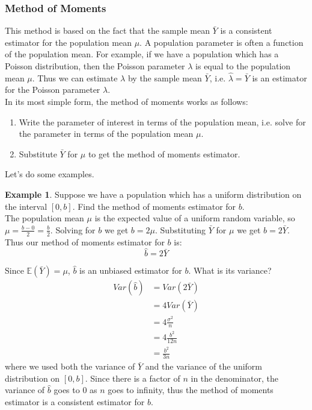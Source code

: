 \documentclass[12pt]{article}
\theoremstyle{definition}
\newtheorem*{example}{Example}
\theoremstyle{remark}
\def\E{{\mathbb E}}
\begin{document}
\subsubsection{Method of Moments}
This method is based on the fact that the sample mean $\bar{Y}$ is a consistent estimator for the population mean $\mu$. A population parameter is often a function of the population mean. For example, if we have a population which has a Poisson distribution, then the Poisson parameter $\lambda$ is equal to the population mean $\mu$. Thus we can estimate $\lambda$ by the sample mean $\bar{Y}$, i.e. $\hat{\lambda} = \bar{Y}$ is an estimator for the Poisson parameter $\lambda$.\\

In its most simple form, the method of moments works as follows:
\begin{enumerate}
\item Write the parameter of interest in terms of the population mean, i.e. solve for the parameter in terms of the population mean $\mu$.
\item Substitute $\bar{Y}$ for $\mu$ to get the method of moments estimator.
\end{enumerate} 

Let's do some examples.

\begin{example}Suppose we have a population which has a uniform distribution on the interval $[0, b]$. Find the method of moments estimator for $b$.\\

The population mean $\mu$ is the expected value of a uniform random variable, so $\mu = \frac{b-0}{2} = \frac{b}{2}$. Solving for $b$ we get $b = 2 \mu$. Substituting $\bar{Y}$ for $\mu$ we get $b = 2 \bar{Y}$. Thus our method of moments estimator for $b$ is:
\[
\hat{b} = 2 \bar{Y}
\]

Since $\E(\bar{Y}) = \mu$, $\hat{b}$ is an unbiased estimator for $b$. What is its variance?
\begin{align*}
Var(\hat{b}) &= Var(2 \bar{Y} ) \\
&= 4 Var(\bar{Y}) \\
&= 4 \frac{\sigma^2}{n} \\
&= 4 \frac{b^2}{12n} \\
&= \frac{b^2}{3n}
\end{align*}
where we used both the variance of $\bar{Y}$ and the variance of the uniform distribution on $[0, b]$. Since there is a factor of $n$ in the denominator, the variance of $\hat{b}$ goes to 0 as $n$ goes to infinity, thus the method of moments estimator is a consistent estimator for $b$.\\
\end{example}
\end{document}
